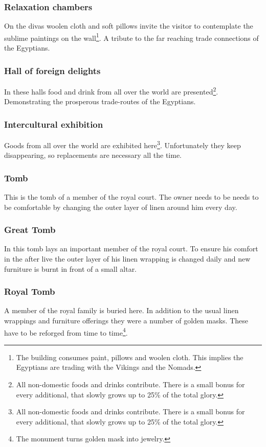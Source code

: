 \documentclass[a4paper]{book}
\begin{document}
		\subsubsection{Relaxation chambers}
			On the divas woolen cloth and soft pillows invite the visitor to contemplate
			the sublime paintings on the wall\footnote{
				The building consumes paint, pillows and woolen cloth.
				This implies the \gls{Egyptians} are trading with the \gls{Vikings}
				and the \gls{Nomads}.
			}.
			A tribute to the far reaching trade connections of the \gls{Egyptians}.

		\subsubsection{Hall of foreign delights}
			In these halls food and drink from all over the world are presented\footnote{
				All non-domestic foods and drinks contribute.
				There is a small bonus for every additional,
				that slowly grows up to 25\% of the total glory.
			}.
			Demonstrating the prosperous trade-routes of the \gls{Egyptians}.

		\subsubsection{Intercultural exhibition}
			Goods from all over the world are exhibited here\footnote{
				All non-domestic foods and drinks contribute.
				There is a small bonus for every additional,
				that slowly grows up to 25\% of the total glory.
			}.
			Unfortunately they keep disappearing, so replacements are necessary
			all the time.

		\subsubsection{Tomb}
			This is the tomb of a member of the royal court.
			The owner needs to be needs to be comfortable by changing
			the outer layer of linen around him every day.

		\subsubsection{Great Tomb}
			In this tomb lays an important member of the royal court.
			To ensure his comfort in the after live the outer layer
			of his linen wrapping is changed daily and new furniture
			is burnt in front of a small altar.

		\subsubsection{Royal Tomb}
			A member of the royal family is buried here.
			In addition to the usual linen wrappings and furniture offerings
			they were a number of golden masks.
			These have to be reforged from time to time\footnote{
				The monument turns golden mask into jewelry.
			}.
\end{document}
